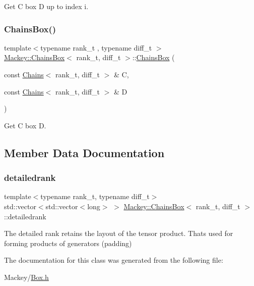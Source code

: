 Get C box D up to index i. 

\mbox{\label{classMackey_1_1ChainsBox_a6e001d0c3284bc1abf6d101bc76ad109}} 
\subsubsection{\texorpdfstring{Chains\+Box()}{ChainsBox()}\hspace{0.1cm}{\footnotesize\ttfamily [4/4]}}
{\footnotesize\ttfamily template$<$typename rank\+\_\+t , typename diff\+\_\+t $>$ \\
\hyperlink{classMackey_1_1ChainsBox}{Mackey\+::\+Chains\+Box}$<$ rank\+\_\+t, diff\+\_\+t $>$\+::\hyperlink{classMackey_1_1ChainsBox}{Chains\+Box} (\begin{DoxyParamCaption}\item[{const \hyperlink{classMackey_1_1Chains}{Chains}$<$ rank\+\_\+t, diff\+\_\+t $>$ \&}]{C,  }\item[{const \hyperlink{classMackey_1_1Chains}{Chains}$<$ rank\+\_\+t, diff\+\_\+t $>$ \&}]{D }\end{DoxyParamCaption})}



Get C box D. 



\subsection{Member Data Documentation}
\mbox{\label{classMackey_1_1ChainsBox_ab4db0344f896a00119783d479af44ed0}} 
\subsubsection{\texorpdfstring{detailedrank}{detailedrank}}
{\footnotesize\ttfamily template$<$typename rank\+\_\+t, typename diff\+\_\+t$>$ \\
std\+::vector$<$std\+::vector$<$long$>$ $>$ \hyperlink{classMackey_1_1ChainsBox}{Mackey\+::\+Chains\+Box}$<$ rank\+\_\+t, diff\+\_\+t $>$\+::detailedrank}



The detailed rank retains the layout of the tensor product. That\textquotesingle{}s used for forming products of generators (padding) 



The documentation for this class was generated from the following file\+:\begin{DoxyCompactItemize}
\item 
Mackey/\hyperlink{Box_8h}{Box.\+h}\end{DoxyCompactItemize}
